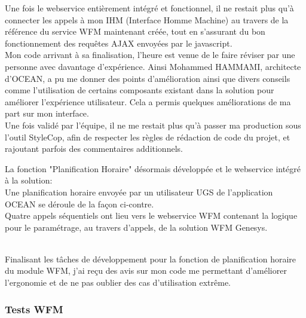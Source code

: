 \documentclass{rapport}
\begin{document}
Une fois le webservice entièrement intégré et fonctionnel, il ne restait plus qu'à connecter les appels à mon IHM (Interface Homme Machine) au travers de la référence du service WFM maintenant créée, tout en s'assurant du bon fonctionnement des requêtes AJAX envoyées par le javascript.\\

Mon code arrivant à sa finalisation, l'heure est venue de le faire réviser par une personne avec davantage d'expérience. Ainsi Mohammed HAMMAMI, architecte d'OCEAN, a pu me donner des points d'amélioration ainsi que divers conseils comme l'utilisation de certains composants existant dans la solution pour améliorer l'expérience utilisateur. Cela a permis quelques améliorations de ma part sur mon interface.\\

Une fois validé par l'équipe, il ne me restait plus qu'à passer ma production sous l'outil StyleCop, afin de respecter les règles de rédaction de code du projet, et rajoutant parfois des commentaires additionnels.\\

\begin{minipage}{0.55\textwidth}
\end{minipage}
\begin{minipage}{0.35\textwidth}
La fonction "Planification Horaire" désormais développée et le webservice intégré à la solution:\\

Une planification horaire envoyée par un utilisateur UGS de l'application OCEAN se déroule de la façon ci-contre.\\

Quatre appels séquentiels ont lieu vers le webservice WFM contenant la logique pour le paramétrage, au travers d'appels, de la solution WFM Genesys.

\end{minipage}
\vspace{5mm} %
\\

Finalisant les tâches de développement pour la fonction de planification horaire du module WFM, j'ai reçu des avis sur mon code me permettant d'améliorer l'ergonomie et de ne pas oublier des cas d'utilisation extrême.

\subsubsection{Tests WFM}
\end{document}
